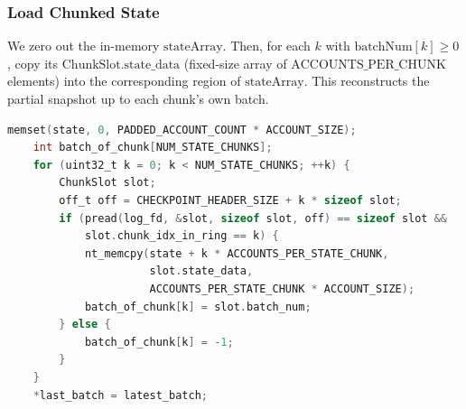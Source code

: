 \documentclass[conference]{IEEEtran}
\begin{document}
\subsubsection*{Load Chunked State}
We zero out the in-memory \(\text{stateArray}\). Then, for each \(k\) with \(\text{batchNum}[k] \ge 0\), copy its \(\text{ChunkSlot.state\_data}\) (fixed-size array of \(\text{ACCOUNTS\_PER\_CHUNK}\) elements) into the corresponding region of \(\text{stateArray}\). This reconstructs the partial snapshot up to each chunk’s own batch.
\begin{lstlisting}[language=C]
    memset(state, 0, PADDED_ACCOUNT_COUNT * ACCOUNT_SIZE);
    int batch_of_chunk[NUM_STATE_CHUNKS];
    for (uint32_t k = 0; k < NUM_STATE_CHUNKS; ++k) {
        ChunkSlot slot;
        off_t off = CHECKPOINT_HEADER_SIZE + k * sizeof slot;
        if (pread(log_fd, &slot, sizeof slot, off) == sizeof slot &&
            slot.chunk_idx_in_ring == k) {
            nt_memcpy(state + k * ACCOUNTS_PER_STATE_CHUNK,
                      slot.state_data,
                      ACCOUNTS_PER_STATE_CHUNK * ACCOUNT_SIZE);
            batch_of_chunk[k] = slot.batch_num;
        } else {
            batch_of_chunk[k] = -1;
        }
    }
    *last_batch = latest_batch;
\end{lstlisting}

\end{document}

